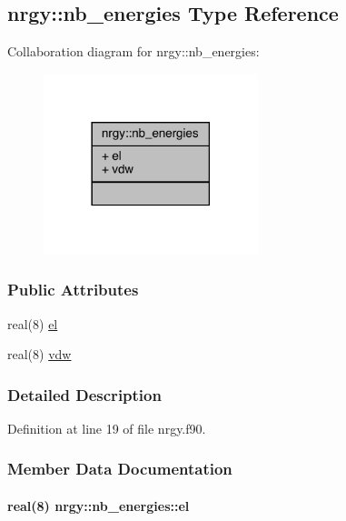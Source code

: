 \hypertarget{structnrgy_1_1nb__energies}{\subsection{nrgy\-:\-:nb\-\_\-energies Type Reference}
\label{structnrgy_1_1nb__energies}
}


Collaboration diagram for nrgy\-:\-:nb\-\_\-energies\-:
\nopagebreak
\begin{figure}[H]
\begin{center}
\leavevmode
\includegraphics[width=177pt]{structnrgy_1_1nb__energies__coll__graph}
\end{center}
\end{figure}
\subsubsection*{Public Attributes}
\begin{DoxyCompactItemize}
\item 
real(8) \hyperlink{structnrgy_1_1nb__energies_adad6a6906607e8b975e46f575405d708}{el}
\item 
real(8) \hyperlink{structnrgy_1_1nb__energies_a3009270d254606521618e9ae88e6538d}{vdw}
\end{DoxyCompactItemize}


\subsubsection{Detailed Description}


Definition at line 19 of file nrgy.\-f90.



\subsubsection{Member Data Documentation}
\hypertarget{structnrgy_1_1nb__energies_adad6a6906607e8b975e46f575405d708}{
\paragraph[{el}]{\setlength{\rightskip}{0pt plus 5cm}real(8) nrgy\-::nb\-\_\-energies\-::el}}\label{structnrgy_1_1nb__energies_adad6a6906607e8b975e46f575405d708}


